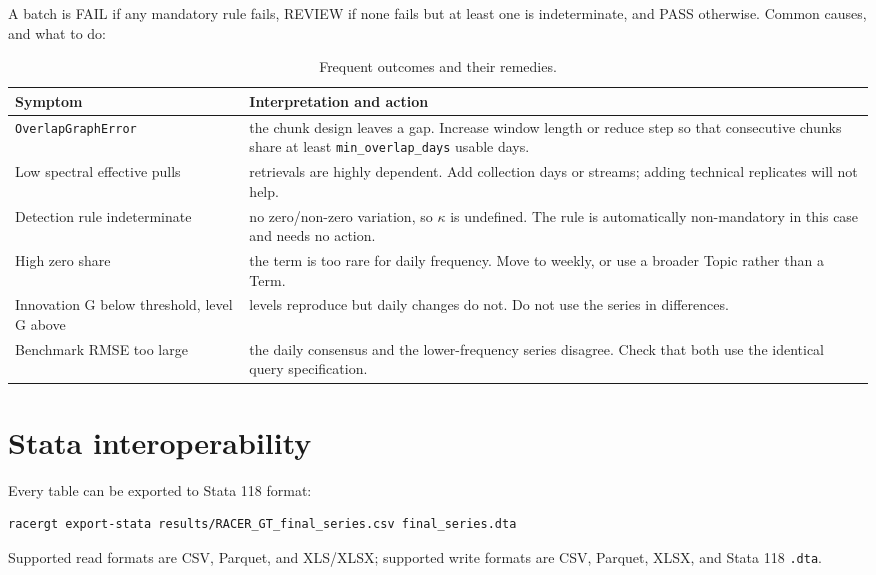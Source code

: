 \documentclass[12pt,a4paper,oneside]{article}
\begin{document}
A batch is FAIL if any mandatory rule fails, REVIEW if none fails but at least
one is indeterminate, and PASS otherwise. Common causes, and what to do:

\begin{table}[H]
\centering\small
\caption{Frequent outcomes and their remedies.}
\begin{tabularx}{\textwidth}{lX}
\toprule
Symptom & Interpretation and action\\
\midrule
\texttt{OverlapGraphError} & the chunk design leaves a gap. Increase window length or reduce step so that consecutive chunks share at least \texttt{min\_overlap\_days} usable days.\\
Low spectral effective pulls & retrievals are highly dependent. Add collection days or streams; adding technical replicates will not help.\\
Detection rule indeterminate & no zero/non-zero variation, so $\kappa$ is undefined. The rule is automatically non-mandatory in this case and needs no action.\\
High zero share & the term is too rare for daily frequency. Move to weekly, or use a broader Topic rather than a Term.\\
Innovation G below threshold, level G above & levels reproduce but daily changes do not. Do not use the series in differences.\\
Benchmark RMSE too large & the daily consensus and the lower-frequency series disagree. Check that both use the identical query specification.\\
\bottomrule
\end{tabularx}
\end{table}

\section{Stata interoperability}

Every table can be exported to Stata 118 format:

\begin{lstlisting}[language=bash]
racergt export-stata results/RACER_GT_final_series.csv final_series.dta
\end{lstlisting}

Supported read formats are CSV, Parquet, and XLS/XLSX; supported write formats
are CSV, Parquet, XLSX, and Stata 118 \texttt{.dta}.

\end{document}
